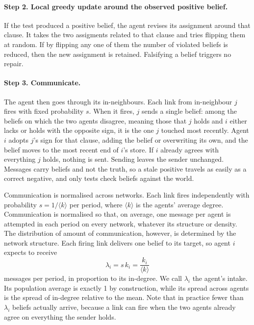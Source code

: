\documentclass[11pt]{article}
\begin{document}
\paragraph{Step 2. Local greedy update around the observed positive belief.} If the test produced a positive belief, the agent revises its assignment around that clause. It takes the two assigments related to that clause and tries flipping them at random. If by flipping any one of them the number of violated beliefs is reduced, then the new assignment is retained. Falsifying a belief triggers no repair. 

\paragraph{Step 3. Communicate.} The agent then goes through its in-neighbours. Each link from in-neighbour $j$ fires with fixed probability $s$. When it fires, $j$ sends a single belief: among the beliefs on which the two agents disagree, meaning those that $j$ holds and $i$ either lacks or holds with the opposite sign, it is the one $j$ touched most recently. Agent $i$ adopts $j$'s sign for that clause, adding the belief or overwriting its own, and the belief moves to the most recent end of $i$'s store. If $i$ already agrees with everything $j$ holds, nothing is sent. Sending leaves the sender unchanged. Messages carry beliefs and not the truth, so a stale positive travels as easily as a correct negative, and only tests check beliefs against the world.

Communication is normalised across networks. Each link fires independently
with probability $s = 1/\langle k\rangle$ per period, where $\langle k\rangle$
is the agents' average degree. Communication is normalised so that, on average, one message per agent is attempted in each period on every network,
whatever its structure or density. The distribution of amount of communication, however, is determined by the network structure. Each firing link delivers one belief to its target, so
agent $i$ expects to receive
\begin{equation}\label{eq:intake}
\lambda_i = s\,k_i = \frac{k_i}{\langle k\rangle}
\end{equation}
messages per period, in proportion to its in-degree. We
call $\lambda_i$ the agent's intake. Its population average is exactly 1 by
construction, while its spread across agents is the spread of in-degree
relative to the mean. Note that in practice fewer than $\lambda_i$ beliefs actually arrive,
because a link can fire when the two agents already agree on everything the
sender holds.
\end{document}
